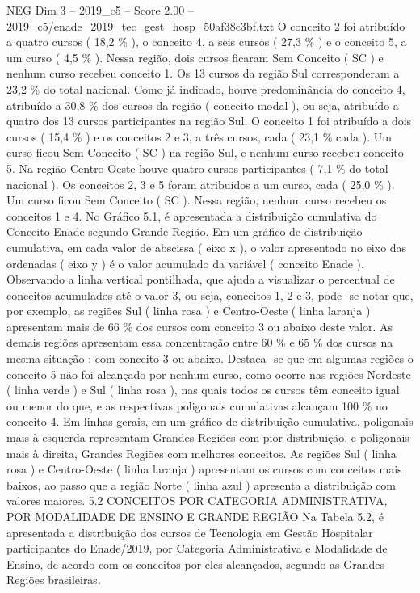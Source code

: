 \begin{textsample}{NEG Dim 3 – 2019\_c5 – Score 2.00 – 2019\_c5/enade\_2019\_tec\_gest\_hosp\_50af38c3bf.txt}
O conceito 2 foi atribuído a quatro cursos ( 18,2 \% ), o conceito 4, a seis cursos ( 27,3 \% ) e o conceito 5, a um curso ( 4,5 \% ).
Nessa região, dois cursos ficaram Sem Conceito ( SC ) e nenhum curso recebeu conceito 1.
Os 13 cursos da região Sul corresponderam a 23,2 \% do total nacional.
Como já indicado, houve predominância do conceito 4, atribuído a 30,8 \% dos cursos da região ( conceito modal ), ou seja, atribuído a quatro dos 13 cursos participantes na região Sul.
O conceito 1 foi atribuído a dois cursos ( 15,4 \% ) e os conceitos 2 e 3, a três cursos, cada ( 23,1 \% cada ).
Um curso ficou Sem Conceito ( SC ) na região Sul, e nenhum curso recebeu conceito 5.
Na região Centro-Oeste houve quatro cursos participantes ( 7,1 \% do total nacional ).
Os conceitos 2, 3 e 5 foram atribuídos a um curso, cada ( 25,0 \% ).
Um curso ficou Sem Conceito ( SC ).
Nessa região, nenhum curso recebeu os conceitos 1 e 4.
No Gráfico 5.1, é apresentada a distribuição cumulativa do Conceito Enade segundo Grande Região.
Em um gráfico de distribuição cumulativa, em cada valor de abscissa ( eixo x ), o valor apresentado no eixo das ordenadas ( eixo y ) é o valor acumulado da variável ( conceito Enade ).
Observando a linha vertical pontilhada, que ajuda a visualizar o percentual de conceitos acumulados até o valor 3, ou seja, conceitos 1, 2 e 3, pode -se notar que, por exemplo, as regiões Sul ( linha rosa ) e Centro-Oeste ( linha laranja ) apresentam mais de 66 \% dos cursos com conceito 3 ou abaixo deste valor.
As demais regiões apresentam essa concentração entre 60 \% e 65 \% dos cursos na mesma situação : com conceito 3 ou abaixo.
Destaca -se que em algumas regiões o conceito 5 não foi alcançado por nenhum curso, como ocorre nas regiões Nordeste ( linha verde ) e Sul ( linha rosa ), nas quais todos os cursos têm conceito igual ou menor do que, e as respectivas poligonais cumulativas alcançam 100 \% no conceito 4.
Em linhas gerais, em um gráfico de distribuição cumulativa, poligonais mais à esquerda representam Grandes Regiões com pior distribuição, e poligonais mais à direita, Grandes Regiões com melhores conceitos.
As regiões Sul ( linha rosa ) e Centro-Oeste ( linha laranja ) apresentam os cursos com conceitos mais baixos, ao passo que a região Norte ( linha azul ) apresenta a distribuição com valores maiores. 5.2 CONCEITOS POR CATEGORIA ADMINISTRATIVA, POR MODALIDADE DE ENSINO E GRANDE REGIÃO Na Tabela 5.2, é apresentada a distribuição dos cursos de Tecnologia em Gestão Hospitalar participantes do Enade/2019, por Categoria Administrativa e Modalidade de Ensino, de acordo com os conceitos por eles alcançados, segundo as Grandes Regiões brasileiras.

\end{textsample}
